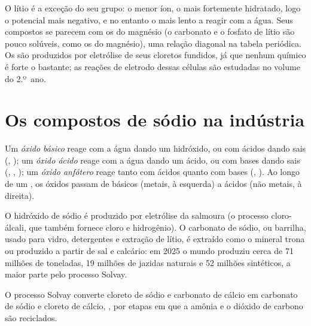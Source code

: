 O lítio é a exceção do seu grupo: o menor íon, o mais fortemente
hidratado, logo o potencial mais negativo, e no entanto o mais lento a
reagir com a água. Seus compostos se parecem com os do magnésio (o
carbonato e o fosfato de lítio são pouco solúveis, como os do magnésio),
uma relação diagonal na tabela periódica. Os  são
produzidos por eletrólise de seus cloretos fundidos, já que nenhum
 químico é forte o bastante; as reações de eletrodo dessas células
são estudadas no volume do 2.º~ano.

\section{Os compostos de sódio na indústria}

\begin{definition}\label{def:b1:s-block:oxide-character}
Um \emph{óxido básico} reage com a água
dando um hidróxido, ou com ácidos dando sais (, ); um
\emph{óxido ácido} reage com a água dando
um ácido, ou com bases dando sais (, , ); um
\emph{óxido anfótero} reage tanto com
ácidos quanto com bases (, ). Ao longo de um , os
óxidos passam de básicos (metais, à esquerda) a ácidos (não metais, à direita).
\end{definition}

O hidróxido de sódio é produzido por eletrólise da salmoura (o processo
cloro-álcali, que também fornece cloro e hidrogênio). O carbonato de
sódio, ou barrilha, usado para vidro, detergentes e extração de lítio, é
extraído como o mineral trona ou produzido a partir de sal e calcário: em
2025 o mundo produziu cerca de 71 milhões de toneladas, 19 milhões de
jazidas naturais e 52 milhões sintéticos, a maior parte pelo processo Solvay.

\begin{proposition}\label{prop:b1:s-block:solvay}
O processo Solvay converte cloreto de sódio e carbonato de cálcio em
carbonato de sódio e cloreto de cálcio, , por etapas em que a amônia e o dióxido de carbono são reciclados.
\end{proposition}

